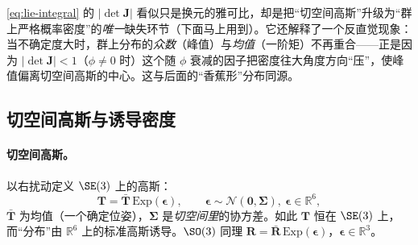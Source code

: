 \begin{insight}
\cref{eq:lie-integral} 的 $|\det\mathbf{J}|$ 看似只是换元的雅可比，却是把“切空间高斯”升级为“群上严格概率密度”的\emph{唯一}缺失环节（下面马上用到）。它还解释了一个反直觉现象：当不确定度大时，群上分布的\emph{众数}（峰值）与\emph{均值}（一阶矩）不再重合——正是因为 $|\det\mathbf{J}|<1$（$\phi\neq0$ 时）这个随 $\phi$ 衰减的因子把密度往大角度方向“压”，使峰值偏离切空间高斯的中心。这与后面的“香蕉形”分布同源。
\end{insight}

\subsection{切空间高斯与诱导密度}
\label{subsec:tangent-gaussian}

\paragraph{切空间高斯。}以右扰动定义 $\SE(3)$ 上的高斯：
\begin{equation}
  \mathbf{T}=\bar{\mathbf{T}}\,\mathrm{Exp}(\boldsymbol{\epsilon}),\qquad \boldsymbol{\epsilon}\sim\mathcal{N}(\mathbf{0},\boldsymbol{\Sigma}),\ \boldsymbol{\epsilon}\in\mathbb{R}^6,
  \label{eq:lie-gaussian}
\end{equation}
$\bar{\mathbf{T}}$ 为均值（一个确定位姿），$\boldsymbol{\Sigma}$ 是\emph{切空间里}的协方差。如此 $\mathbf{T}$ 恒在 $\SE(3)$ 上，而“分布”由 $\mathbb{R}^6$ 上的标准高斯诱导。$\SO(3)$ 同理 $\mathbf{R}=\bar{\mathbf{R}}\,\mathrm{Exp}(\boldsymbol{\epsilon})$，$\boldsymbol{\epsilon}\in\mathbb{R}^3$。

